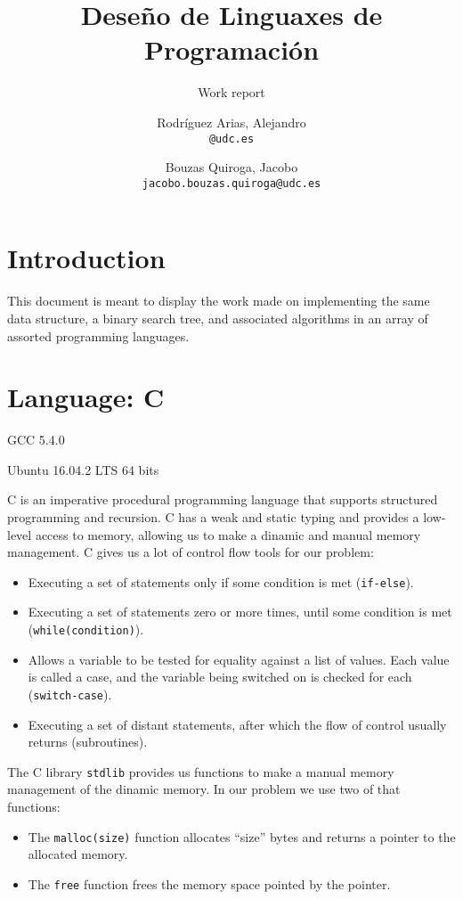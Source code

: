 \documentclass[11pt]{scrartcl} %
\title{Deseño de Linguaxes de Programación}
\subtitle{Work report}
\author{Rodríguez Arias, Alejandro\\
	\texttt{@udc.es}
	\and Bouzas Quiroga, Jacobo\\
	\texttt{jacobo.bouzas.quiroga@udc.es}}
\date{\displaydate{release}}
\begin{document}
\maketitle
\clearpage
\tableofcontents
\clearpage

\section{Introduction}

This document is meant to display the work made on implementing the same data structure, a binary search tree, and associated algorithms in an array of assorted programming languages.

\section{Language: C}

\begin{description}[align=left,labelwidth=10em]
\item [Compiler] GCC 5.4.0
\item [Operating System] Ubuntu 16.04.2 LTS 64 bits
\end{description}

C is an imperative procedural programming language that supports structured programming and recursion. C has a weak and static typing and provides a low-level access to memory, allowing us to make a dinamic and manual memory management. C gives us a lot of control flow tools for our problem:

\begin{itemize}  
\item Executing a set of statements only if some condition is met (\texttt{if-else}).
\item Executing a set of statements zero or more times, until some condition is met (\texttt{while(condition)}). 
\item Allows a variable to be tested for equality against a list of values. Each value is called a case, and the variable being switched on is checked for each (\texttt{switch-case}).
\item Executing a set of distant statements, after which the flow of control usually returns (subroutines).
\end{itemize}

The C library \texttt{stdlib} provides us  functions to make a manual memory management of the dinamic memory. In our problem we use two of that functions:
\begin{itemize}
\item The \texttt{malloc(size)} function allocates “size” bytes and returns a pointer to the allocated memory.
\item The \texttt{free} function frees the memory space pointed by the pointer.
\end{itemize}
	
\end{document}
